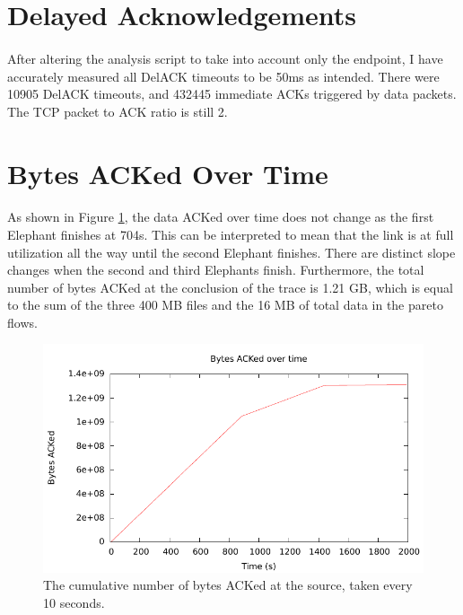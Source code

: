 \documentclass{article}
\begin{document}
\paragraph{}


\section{Delayed Acknowledgements}
\paragraph{}
After altering the analysis script to take into account only the endpoint, I have accurately measured all DelACK timeouts to be 50ms as intended.
There were 10905 DelACK timeouts, and 432445 immediate ACKs triggered by data packets.
The TCP packet to ACK ratio is still 2.

\section{Bytes ACKed Over Time}
\paragraph{}
As shown in Figure \ref{fig:ack_plot}, the data ACKed over time does not change as the first Elephant finishes at 704s.
This can be interpreted to mean that the link is at full utilization all the way until the second Elephant finishes.
There are distinct slope changes when the second and third Elephants finish.
Furthermore, the total number of bytes ACKed at the conclusion of the trace is 1.21 GB, which is equal to the sum of the three 400 MB files and the 16 MB of total data in the pareto flows.

\begin{figure}[h]
  \begin{centering}
    \includegraphics{ack_plot}
    \caption{The cumulative number of bytes ACKed at the source, taken every 10 seconds.}
    \label{fig:ack_plot}
  \end{centering}
\end{figure}
\end{document}
